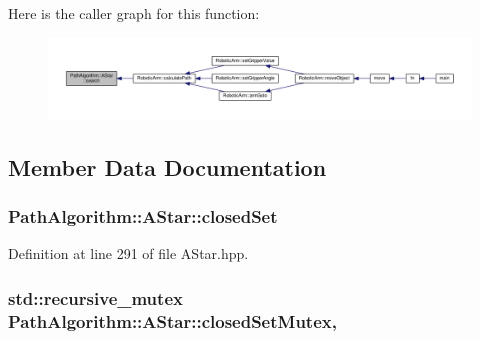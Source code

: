 Here is the caller graph for this function\+:\nopagebreak
\begin{figure}[H]
\begin{center}
\leavevmode
\includegraphics[width=350pt]{class_path_algorithm_1_1_a_star_aee41b31ec44b02f6dc94889d228a3582_icgraph}
\end{center}
\end{figure}




\subsection{Member Data Documentation}
\subsubsection[{\texorpdfstring{closed\+Set}{closedSet}}]{ Path\+Algorithm\+::\+A\+Star\+::closed\+Set\hspace{0.3cm}{\ttfamily [private]}}\hypertarget{class_path_algorithm_1_1_a_star_ac30f7714d07594a6b75516daa0a26da7}{}\label{class_path_algorithm_1_1_a_star_ac30f7714d07594a6b75516daa0a26da7}


Definition at line 291 of file A\+Star.\+hpp.

\subsubsection[{\texorpdfstring{closed\+Set\+Mutex}{closedSetMutex}}]{\setlength{\rightskip}{0pt plus 5cm}std\+::recursive\+\_\+mutex Path\+Algorithm\+::\+A\+Star\+::closed\+Set\+Mutex\hspace{0.3cm}{\ttfamily [mutable]}, {\ttfamily [private]}}\hypertarget{class_path_algorithm_1_1_a_star_a1c8d2da0af60b0857bfd0abd3fa057ac}{}\label{class_path_algorithm_1_1_a_star_a1c8d2da0af60b0857bfd0abd3fa057ac}


